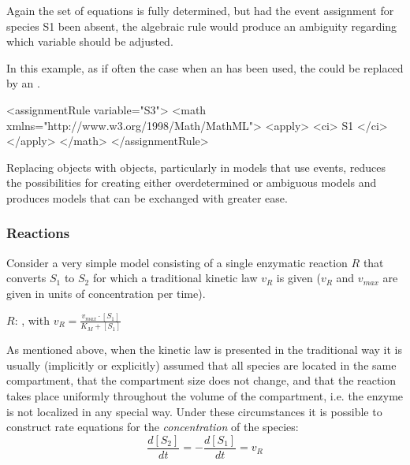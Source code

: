 Again the set of equations is fully determined, but had the event
assignment for species S1 been absent, the algebraic rule would
produce an ambiguity regarding which variable should be adjusted.

In this example, as if often the case when an \AlgebraicRule has
been used, the \AlgebraicRule could be replaced by an \AssignmentRule.

\begin{example}
<assignmentRule variable="S3">
    <math xmlns="http://www.w3.org/1998/Math/MathML">
        <apply>
            <ci> S1 </ci>
        </apply>
    </math>
</assignmentRule>
\end{example}

Replacing \AlgebraicRule objects with \AssignmentRule objects,
particularly in models that use events, reduces the possibilities
for creating either overdetermined or ambiguous models and
produces models that can be exchanged with greater ease.


\subsubsection{Reactions}
\label{sec:bp:reactions}


Consider a very simple model consisting of a single enzymatic reaction
$R$ that converts $S_{1}$ to $S_{2}$ for which a traditional kinetic
law $v_{R}$ is given ($v_{R}$ and $v_{max}$ are given in units
of concentration per time). 

\begin{center}
$R$: , with $v_{R}=\frac{v_{max}\cdot[S_{1}]}{K_{M}+[S_{1}]}$
\par\end{center}

As mentioned above, when the kinetic law is presented in the traditional
way it is usually (implicitly or explicitly) assumed that all species
are located in the same compartment, that the compartment size does
not change, and that the reaction takes place uniformly throughout
the volume of the compartment, i.e. the enzyme is not localized in
any special way. Under these circumstances it is possible to construct
rate equations for the \emph{concentration} of the species:\[
\frac{d[S_{2}]}{dt}=-\frac{d[S_{1}]}{dt}=v_{R}\]


